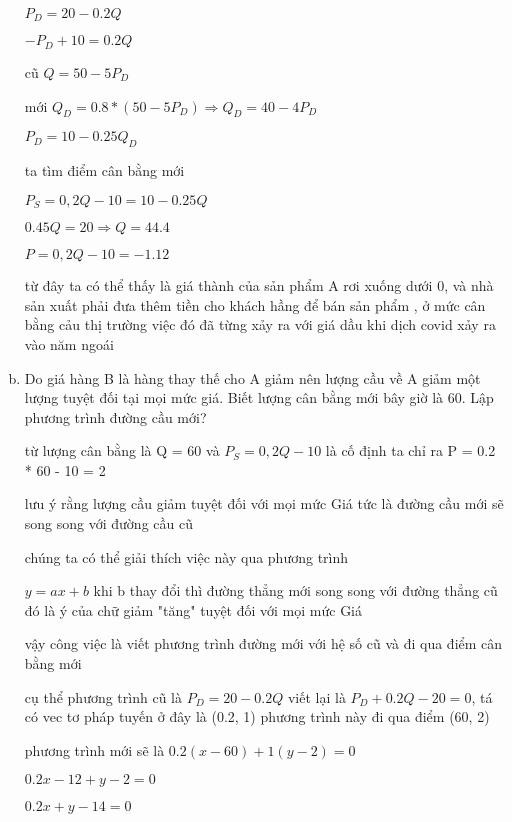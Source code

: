 \documentclass{report}
\begin{document}
\begin{enumerate}[a.]

    $P_D = 20 - 0.2Q$

    $ -P_D  + 10 = 0.2Q$

    cũ $Q = 50 - 5P_D$

    mới $Q_D = 0.8 * (50 - 5P_D) \Rightarrow Q_D = 40 - 4P_D$

    $P_D = 10 - 0.25Q_D$

    ta tìm điểm cân bằng mới 

    $P_S = 0,2Q - 10 = 10 - 0.25Q$

    $0.45Q = 20 \Rightarrow Q = 44.4$

    $P = 0,2Q - 10 = -1.12$

    từ đây ta có thể thấy là giá thành của sản phẩm A rơi xuống dưới 0, và nhà sản xuất phải đưa thêm tiền cho khách hầng để bán sản phẩm , ở mức cân bằng cảu thị trường việc đó đã từng xảy ra với giá dầu khi dịch covid xảy ra vào năm ngoái 

    \item  Do giá hàng B là hàng thay thế cho A giảm nên lượng cầu về A giảm một lượng 
    tuyệt đối tại mọi mức giá. Biết lượng cân bằng mới bây giờ là 60. Lập phương trình 
    đường cầu mới?

    từ lượng cân bằng là Q = 60 và $P_S = 0,2Q - 10$ là cố định
     ta chỉ ra P = 0.2 * 60 - 10 = 2

     lưu ý rằng lượng cầu giảm tuyệt đối với mọi mức Giá
     tức là đường cầu mới sẽ song song với đường cầu cũ 

     chúng ta có thể giải thích việc này qua phương trình 

     $y = ax + b$ khi b thay đổi thì đường thẳng mới song song với đường thẳng cũ đó là ý của chữ giảm "tăng"  tuyệt đối với mọi mức Giá

     vậy công việc là viết phương trình đường mới với hệ số cũ 
     và đi qua điểm cân bằng mới 

     cụ thể phương trình cũ là 
     $P_D = 20 - 0.2Q$ viết lại là 
     $P_D + 0.2Q - 20 = 0$, 
     tá có vec tơ pháp tuyến ở đây là (0.2, 1)
     phương trình này đi qua  điểm (60, 2)

     phương trình mới sẽ là 
     $0.2 (x - 60) + 1 (y - 2) = 0$

     $0.2x - 12 + y - 2 = 0 $

     $0.2x + y - 14 = 0$


\end{enumerate}
\end{document}

